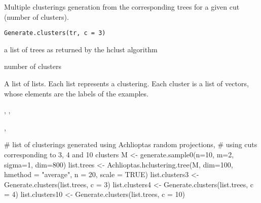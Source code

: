 \documentclass{article}
\begin{document}
\begin{Description}\relax
Multiple clusterings generation from the corresponding trees for a given cut (number of clusters).
\end{Description}
\begin{Usage}
\begin{verbatim}
Generate.clusters(tr, c = 3)
\end{verbatim}
\end{Usage}
\begin{Arguments}
\begin{ldescription}
\item[\code{tr}] a list  of trees as returned by the hclust algorithm 
\item[\code{c}] number of clusters 
\end{ldescription}
\end{Arguments}
\begin{Value}
A list  of lists.
Each list represents a clustering. Each cluster is a list of vectors, whose elements are the labels of the examples.
\end{Value}
\begin{SeeAlso}\relax
{},  ,

,
\end{SeeAlso}
\begin{Examples}
\begin{ExampleCode}
# list of clusterings generated using Achlioptas random projections, 
# using cuts corresponding to 3, 4 and 10 clusters
M <- generate.sample0(n=10, m=2, sigma=1, dim=800)
list.trees <- Achlioptas.hclustering.tree(M, dim=100, hmethod = "average", 
                                          n = 20, scale = TRUE)
list.clusters3 <- Generate.clusters(list.trees, c = 3)
list.clusters4 <- Generate.clusters(list.trees, c = 4)
list.clusters10 <- Generate.clusters(list.trees, c = 10)
\end{ExampleCode}
\end{Examples}
\end{document}
